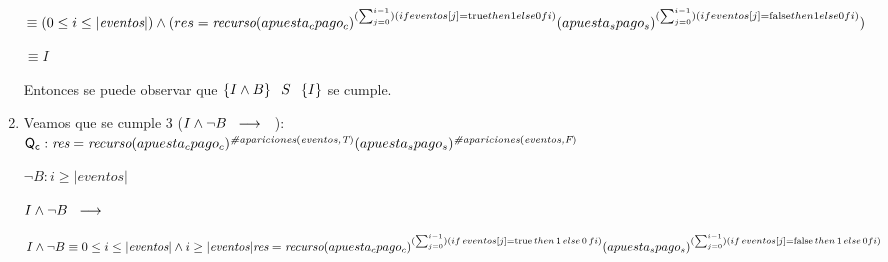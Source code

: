 \documentclass[10pt,a4paper]{article}
\begin{document}
\begin{enumerate}
        $\equiv (0 \leq i \leq |\textit{eventos}\vert) \land \\
        (res = \textit{recurso}(\textit{$apuesta_{c}$}\textit{$pago_{c}$})^{(\sum_{j = 0}^{i-1})(if eventos[j] = \mathrm{true}  then 1 else 0  fi)}(\textit{$apuesta_{s}$}\textit{$pago_{s}$})^{(\sum_{j = 0}^{i-1})(if eventos[j] = \mathrm{false} then 1 else 0 fi)})
        $

        $\equiv I $

        Entonces se puede observar que $\left\lbrace I \land B \right\rbrace \hspace{2mm} S \hspace{2mm} \left\lbrace I \right\rbrace$ \hspace{1mm} se cumple.

        \clearpage

        \item Veamos que se cumple 3 ($I \land \neg B \hspace{2mm} \longrightarrow \hspace{2mm} $ \postcondicion):\\
        
        $\mathsf{Q_{c}}: \textit{res}=\textit{recurso}(\textit{$apuesta_{c}$}\textit{$pago_{c}$})^{\textit{\#apariciones}(\textit{eventos,T})}(\textit{$apuesta_{s}$}\textit{$pago_{s}$})^{\textit{\#apariciones}(\textit{eventos,F})}$

        $\neg B: i \geq |{\textit{eventos}}\vert$

        $I \land \neg B \hspace{2mm} \longrightarrow \hspace{2mm} $ \postcondicion

        $I \land \neg B \equiv  0 \leq i \leq |\textit{eventos}\vert \land i \geq |\textit{eventos}\vert \\
        \textit{res} = \textit{recurso}(\textit{$apuesta_{c}$}\textit{$pago_{c}$})^{(\sum_{j = 0}^{i -1})(if \hspace{0.5mm} eventos[j] = \mathrm{true} \hspace{0.5mm} then \hspace{0.5mm} 1 \hspace{0.5mm} else \hspace{0.5mm} 0 \hspace{0.5mm} fi)}
        (\textit{$apuesta_{s}$}\textit{$pago_{s}$})^{(\sum_{j = 0}^{i -1})(if \hspace{0.5mm} eventos[j] = \mathrm{false} \hspace{0.5mm} then  \hspace{0.5mm} 1  \hspace{0.5mm} else \hspace{0.5mm} 0 fi)}$\\


\end{enumerate}
\end{document}
